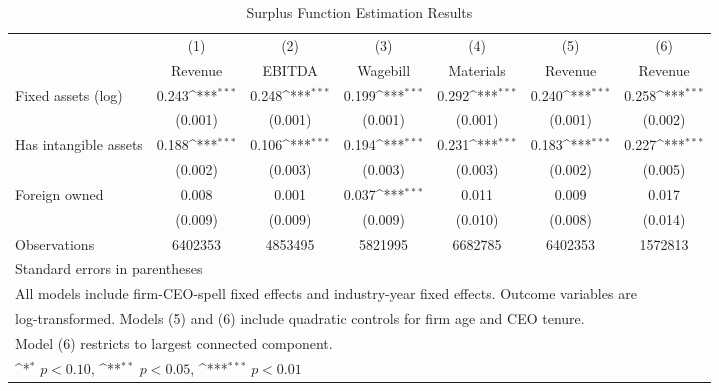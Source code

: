 \begin{table}[htbp]\centering
\def\sym#1{\ifmmode^{#1}\else\(^{#1}\)\fi}
\caption{Surplus Function Estimation Results}
\begin{tabular}{l*{6}{c}}
\toprule
                    &\multicolumn{1}{c}{(1)}&\multicolumn{1}{c}{(2)}&\multicolumn{1}{c}{(3)}&\multicolumn{1}{c}{(4)}&\multicolumn{1}{c}{(5)}&\multicolumn{1}{c}{(6)}\\
                    &\multicolumn{1}{c}{Revenue}&\multicolumn{1}{c}{EBITDA}&\multicolumn{1}{c}{Wagebill}&\multicolumn{1}{c}{Materials}&\multicolumn{1}{c}{Revenue}&\multicolumn{1}{c}{Revenue}\\
\midrule
Fixed assets (log)  &       0.243\sym{***}&       0.248\sym{***}&       0.199\sym{***}&       0.292\sym{***}&       0.240\sym{***}&       0.258\sym{***}\\
                    &     (0.001)         &     (0.001)         &     (0.001)         &     (0.001)         &     (0.001)         &     (0.002)         \\
\addlinespace
Has intangible assets&       0.188\sym{***}&       0.106\sym{***}&       0.194\sym{***}&       0.231\sym{***}&       0.183\sym{***}&       0.227\sym{***}\\
                    &     (0.002)         &     (0.003)         &     (0.003)         &     (0.003)         &     (0.002)         &     (0.005)         \\
\addlinespace
Foreign owned       &       0.008         &       0.001         &       0.037\sym{***}&       0.011         &       0.009         &       0.017         \\
                    &     (0.009)         &     (0.009)         &     (0.009)         &     (0.010)         &     (0.008)         &     (0.014)         \\
\midrule
Observations        &     6402353         &     4853495         &     5821995         &     6682785         &     6402353         &     1572813         \\
\bottomrule
\multicolumn{7}{l}{\footnotesize Standard errors in parentheses}\\
\multicolumn{7}{l}{\footnotesize All models include firm-CEO-spell fixed effects and industry-year fixed effects. Outcome variables are}\\
\multicolumn{7}{l}{\footnotesize log-transformed. Models (5) and (6) include quadratic controls for firm age and CEO tenure.}\\
\multicolumn{7}{l}{\footnotesize Model (6) restricts to largest connected component.}\\
\multicolumn{7}{l}{\footnotesize \sym{*} \(p<0.10\), \sym{**} \(p<0.05\), \sym{***} \(p<0.01\)}\\
\end{tabular}
\end{table}
